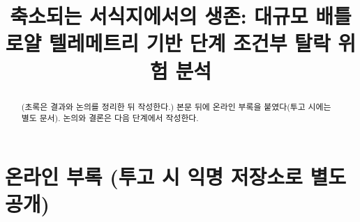 \documentclass[conference]{IEEEtran}
\newcommand{\rev}[1]{{\color{revblue}#1}}
\begin{document}
\title{축소되는 서식지에서의 생존: 대규모 배틀로얄 텔레메트리 기반 단계 조건부 탈락 위험 분석}
\author{}
\maketitle

\begin{abstract}
(초록은 결과와 논의를 정리한 뒤 작성한다.) \rev{본문 뒤에 온라인 부록을 붙였다(투고 시에는 별도 문서). 논의와 결론은 다음 단계에서 작성한다.}
\end{abstract}









\clearpage
\section*{온라인 부록 (투고 시 익명 저장소로 별도 공개)}

\end{document}
